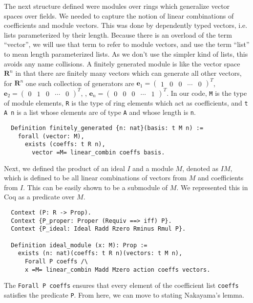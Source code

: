 \documentclass{article}
\begin{document}
The next structure defined were modules over rings which generalize vector
spaces over fields. We needed to capture the notion of linear combinations of
coefficients and module vectors. This was done by dependently typed vectors,
i.e. lists parameterized by their length. Because there is an overload of the
term ``vector'', we will use that term to refer to module vectors, and use the
term ``list'' to mean length parameterized lists. As we don't use the simpler
kind of lists, this avoids any name collisions. A finitely generated module is
like the vector space \(\mathbf{R}^{n}\) in that there are finitely many
vectors which can generate all other vectors, for \(\mathbf{R}^{n}\) one such
collection of generators are \(\mathbf{e}_{1} = \begin{pmatrix} 1 & 0 & 0 &
  \cdots & 0\end{pmatrix}^{T}\), \(\mathbf{e}_{2} = \begin{pmatrix} 0 & 1 & 0 &
  \cdots & 0\end{pmatrix}^{T}\), \textellipsis, \(\mathbf{e}_{n} =
  \begin{pmatrix} 0 & 0 & 0 & \cdots & 1\end{pmatrix}^{T}\). In our code,
\texttt{M} is the type of module elements, \texttt{R} is the type of ring
elements which act as coefficients, and \texttt{t A n} is a list whose elements
are of type \texttt{A} and whose length is \texttt{n}.
\begin{verbatim}
  Definition finitely_generated {n: nat}(basis: t M n) :=
    forall (vector: M),
      exists (coeffs: t R n),
        vector =M= linear_combin coeffs basis.
\end{verbatim}

Next, we defined the product of an ideal \(I\) and a module \(M\), denoted as
\(I M\), which is defined to be all linear combinations of vectors from \(M\)
and coefficients from \(I\). This can be easily shown to be a submodule of
\(M\). We represented this in Coq as a predicate over \(M\).
\begin{verbatim}
  Context (P: R -> Prop).
  Context {P_proper: Proper (Requiv ==> iff) P}.
  Context {P_ideal: Ideal Radd Rzero Rminus Rmul P}.
  
  Definition ideal_module (x: M): Prop :=
    exists (n: nat)(coeffs: t R n)(vectors: t M n),
      Forall P coeffs /\
      x =M= linear_combin Madd Mzero action coeffs vectors.
\end{verbatim}
The \verb|Forall P coeffs| ensures that every element of the coefficient list
\texttt{coeffs} satisfies the predicate \texttt{P}. From here, we can move to
stating Nakayama's lemma.
\end{document}
